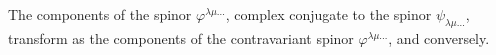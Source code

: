 The components of the spinor $\varphi^{\lambda\mu\ldots}$, complex conjugate to
the spinor $\psi_{\lambda\mu\ldots}$, transform as the components of the
contravariant spinor $\varphi^{\lambda\mu\ldots}$, and conversely.
